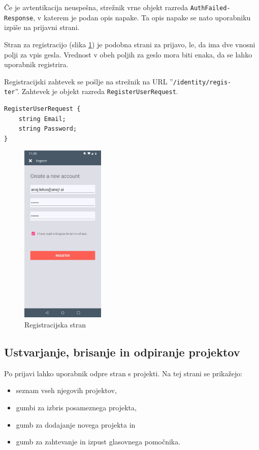 \documentclass[a4paper, 12pt]{book}
\begin{document}
Če je avtentikacija neuspešna, strežnik vrne objekt razreda \texttt{AuthFailed-\\Response}, v katerem je podan opis napake.
Ta opis napake se nato uporabniku izpiše na prijavni strani.

Stran za registracijo (slika \ref{app_register}) je podobna strani za prijavo, le, da ima dve vnosni polji za vpis gesla.
Vrednost v obeh poljih za geslo mora biti enaka, da se lahko uporabnik registrira.

Registracijski zahtevek se pošlje na strežnik na URL ''\texttt{/identity/regis-\\ter}''.
Zahtevek je objekt razreda \texttt{RegisterUserRequest}.

\begin{Verbatim}[commandchars=+\[\]]
RegisterUserRequest {
    string Email; 
    string Password;
}
\end{Verbatim}

\begin{figure}[H]
\begin{center}
\includegraphics[width=4cm]{app_register}
\end{center}
	\caption{Registracijska stran}
\label{app_register}
\end{figure}

\subsection{Ustvarjanje, brisanje in odpiranje projektov}

Po prijavi lahko uporabnik odpre stran s projekti.
Na tej strani se prikažejo:
\begin{itemize}
	\item seznam vseh njegovih projektov, 
	\item gumbi za izbris posameznega projekta,
	\item gumb za dodajanje novega projekta in
	\item gumb za zahtevanje in izpust glasovnega pomočnika.
\end{itemize}
\end{document}
